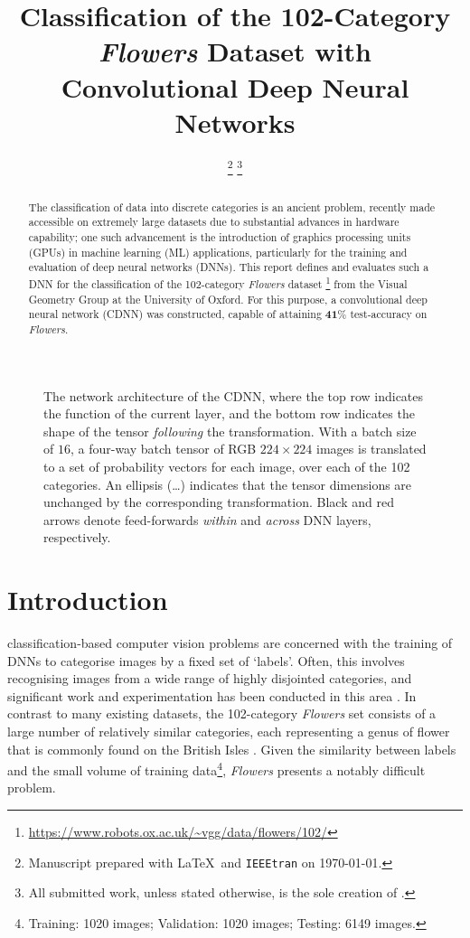 \documentclass[journal]{IEEEtran}
\title{Classification of the 102-Category \emph{Flowers} Dataset with
    Convolutional Deep Neural Networks}
\author{\candidate%
    \thanks{Manuscript prepared with \LaTeX\ and \texttt{IEEEtran} on \today.}%
    \thanks{All submitted work, unless stated otherwise, is the sole creation
    of \candidate.}}
\newcommand\networkperformance{41}
\begin{document}
\maketitle
\begin{figure*}[t]
    \caption{The network architecture of the CDNN, where the top row indicates
    the function of the current layer, and the bottom row indicates the shape of
    the tensor \emph{following} the transformation. With a batch size of $16$, a
    four-way batch tensor of RGB $224 \times 224$ images is translated to a set
    of probability vectors for each image, over each of the 102 categories. An
    ellipsis (\ldots) indicates that the tensor dimensions are unchanged by the
    corresponding transformation. Black and red arrows denote feed-forwards
    \emph{within} and \emph{across} DNN layers, respectively.}%
    \label{fig:network-architecture}
\end{figure*}
\begin{abstract}
    The classification of data into discrete categories is an ancient problem,
    recently made accessible on extremely large datasets due to substantial
    advances in hardware capability; one such advancement is the introduction of
    graphics processing units (GPUs) in machine learning (ML) applications,
    particularly for the training and evaluation of deep neural networks (DNNs).
    This report defines and evaluates such a DNN for the classification of the
    102-category \emph{Flowers} dataset%
    \footnote{\url{https://www.robots.ox.ac.uk/~vgg/data/flowers/102/}} from the
    Visual Geometry Group at the University of Oxford.  For this purpose, a
    convolutional deep neural network (CDNN) was constructed, capable of
    attaining $\mathbf{\networkperformance}$\% test-accuracy on \emph{Flowers}.
\end{abstract}
\section{Introduction}
 classification-based computer vision problems are
concerned with the training of DNNs to categorise images by a fixed set of
`labels'. Often, this involves recognising images from a wide range of highly
disjointed categories, and significant work and experimentation has been
conducted in this area \cite{Chen:2021}. In contrast to many existing datasets,
the 102-category \emph{Flowers} set consists of a large number of relatively
similar categories, each representing a genus of flower that is commonly found
on the British Isles \cite{Nilsback:2008}. Given the similarity between labels
and the small volume of training data\footnote{Training: 1020 images;
Validation: 1020 images; Testing: 6149 images.}, \emph{Flowers} presents a
notably difficult problem.
\end{document}
